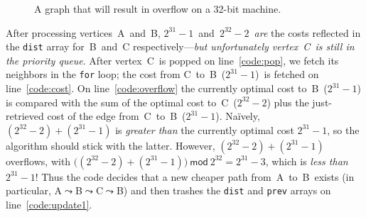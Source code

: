 \begin{figure}[t]
\centering
{}
\caption{A graph that will result in overflow on a 32-bit machine.}
\label{fig:overflow}
\end{figure}


After processing vertices~A~and~B, $2^{31}-1$~and~$2^{32}-2$~\emph{are} the costs reflected in the \texttt{dist} array for~B~and~C respectively---\emph{but unfortunately vertex~C~is still in the priority queue}.  After vertex~C~is popped on line~\ref{code:pop}, we fetch its neighbors in the \texttt{for} loop; the cost from C~to~B~($2^{31}-1$)~is fetched on line~\ref{code:cost}.  On line~\ref{code:overflow} the currently optimal cost to~B~($2^{31}-1$) is compared with the sum of the optimal cost to~C~($2^{32}-2$) plus the just-retrieved cost of the edge from~C~to~B~($2^{31}-1$).  Na\"ively, $(2^{32}-2)+(2^{31}-1)$ is \emph{greater than} the currently optimal cost $2^{31}-1$, so the algorithm should stick with the latter.  However, $(2^{32}-2)+(2^{31}-1)$ overflows, with $\big((2^{32}-2)+(2^{31}-1)\big)~\mathsf{mod}~2^{32}=2^{31}-3$, which is \emph{less than} $2^{31}-1$!
Thus the code decides that a new cheaper path from~A~to~B~exists (in particular, A$\leadsto$B$\leadsto$C$\leadsto$B) and then trashes the \texttt{dist} and \texttt{prev} arrays on line~\ref{code:update1}.


